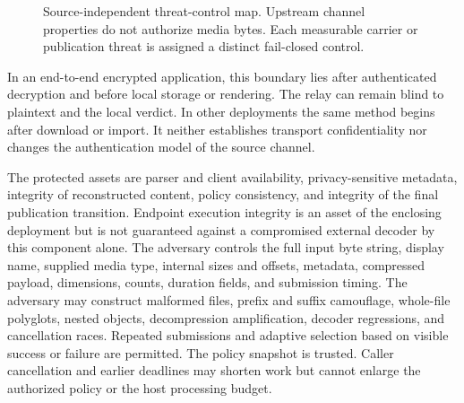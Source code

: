 \begin{figure}[t]
{%
}
\caption{Source-independent threat-control map. Upstream channel properties do
not authorize media bytes. Each measurable carrier or publication threat is
assigned a distinct fail-closed control.}
\label{fig:component-architecture}
\end{figure}

In an end-to-end encrypted application, this boundary lies after authenticated
decryption and before local storage or rendering. The relay can remain blind to
plaintext and the local verdict. In other deployments the same method begins
after download or import. It neither establishes transport confidentiality nor
changes the authentication model of the source channel.

The protected assets are parser and client availability, privacy-sensitive
metadata, integrity of reconstructed content, policy consistency, and integrity
of the final publication transition. Endpoint execution integrity is an asset
of the enclosing deployment but is not guaranteed against a compromised
external decoder by this component alone. The adversary controls the full input
byte string, display name, supplied media
type, internal sizes and offsets, metadata, compressed payload, dimensions,
counts, duration fields, and submission timing. The adversary may construct
malformed files, prefix and suffix camouflage, whole-file polyglots, nested
objects, decompression amplification, decoder regressions, and cancellation
races. Repeated submissions and adaptive selection based on visible success or
failure are permitted. The policy snapshot is trusted. Caller cancellation and
earlier deadlines may shorten work but cannot enlarge the authorized policy or
the host processing budget.

